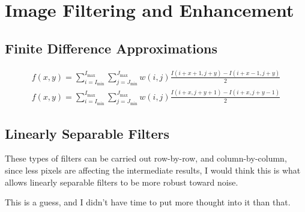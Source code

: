%
%

\section{Image Filtering and Enhancement}

\subsection{Finite Difference Approximations}
\begin{align}
    f(x,y) =
    \sum_{i=I_{\text{min}}}^{I_{\text{max}}}
    \sum_{j=J_{\text{min}}}^{J_{\text{max}}}
    w(i,j) \frac{I(i + x + 1, j + y) - I(i + x - 1, j + y)}{2}
    \\
    f(x,y) =
    \sum_{i=I_{\text{min}}}^{I_{\text{max}}}
    \sum_{j=J_{\text{min}}}^{J_{\text{max}}}
    w(i,j) \frac{I(i + x, j + y + 1) - I(i + x, j + y - 1)}{2}
\end{align}

\subsection{Linearly Separable Filters}
These types of filters can be carried out row-by-row, and column-by-column,
since less pixels are affecting the intermediate results, I would think this
is what allows linearly separable filters to be more robust toward noise.

This is a guess, and I didn't have time to put more thought into it than that.

